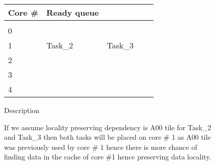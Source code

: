 \documentclass{article}
\begin{document}
\begin{figure}
\begin{minipage}{1.0\linewidth}
\begin{tabular}{l | l l l l}
Core \# & Ready queue\\
\hline
&\\
0 & & & &\\
1 & Task\_2 & Task\_3 & &\\
2 & & & &\\
3 & & & &\\
4 & & & &\\
\end{tabular}
\end{minipage}

\begin{minipage}{1.0\linewidth}
Description

If we assume locality preserving dependency is A00 tile for Task\_2 and Task\_3 then both tasks will be placed on core \# 1 as A00 tile was previously used by core \# 1 hence there is more chance of finding data in the cache of core \#1 hence preserving data locality.

\begin{verbatim}






\end{verbatim}
\end{minipage}

\end{figure}
\end{document}

